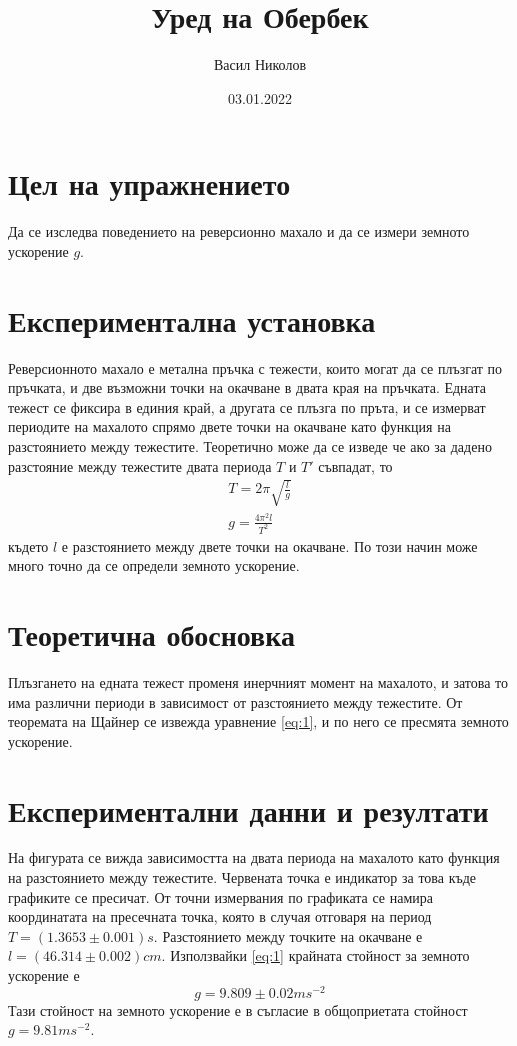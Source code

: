 \documentclass[aps, prb, twocolumn, a4paper, floatfix, reprint]{revtex4-2}
\begin{document}
\title{Уред на Обербек}
\author{Васил Николов}
\noaffiliation
\date{03.01.2022}
\maketitle

\section{Цел на упражнението}
Да се изследва поведението на реверсионно махало и да се измери земното ускорение $g$.

\section{Експериментална установка}
Реверсионното махало е метална пръчка с тежести, които могат да се плъзгат по пръчката, и две възможни точки на окачване в двата края на пръчката. Едната тежест се фиксира в единия край, а другата се плъзга по пръта, и се измерват периодите на махалото спрямо двете точки на окачване като функция на разстоянието между тежестите. Теоретично може да се изведе че ако за дадено разстояние между тежестите двата периода $T$ и $T'$ съвпадат, то
\begin{gather*} 
    T = 2\pi \sqrt{\frac{l}{g}} \\
    g = \frac{4\pi^2 l}{T^2} \label{eq:1} \tag{1}
\end{gather*}
където $l$ е разстоянието между двете точки на окачване. По този начин може много точно да се определи земното ускорение.  

\section{Теоретична обосновка}
Плъзгането на едната тежест променя инерчният момент на махалото, и затова то има различни периоди в зависимост от разстоянието между тежестите. От теоремата на Щайнер се извежда уравнение \eqref{eq:1}, и по него се пресмята земното ускорение. 

\section{Експериментални данни и резултати}


На фигурата се вижда зависимостта на двата периода на махалото като функция на разстоянието между тежестите. Червената точка е индикатор за това къде графиките се пресичат. От точни измервания по графиката се намира координатата на пресечната точка, която в случая отговаря на период $T=(1.3653 \pm 0.001)s$. Разстоянието между точките на окачване е $l=(46.314 \pm 0.002)cm$. Използвайки \eqref{eq:1} крайната стойност за земното ускорение е 
\begin{equation*}
    g = 9.809 \pm 0.02 ms^{-2} 
\end{equation*} 
Тази стойност на земното ускорение е в съгласие в общоприетата стойност $g=9.81 ms^{-2}$.
\end{document}
